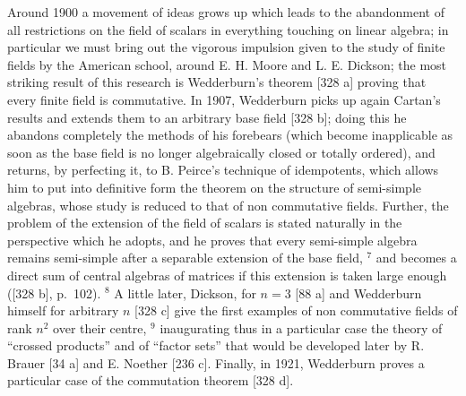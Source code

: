 Around 1900 a movement of ideas grows up which leads to the abandonment of all restrictions on the field of scalars in everything touching on linear algebra; in particular we must bring out the vigorous impulsion given to the study of finite fields by the American school, around E. H. Moore and L. E. Dickson; the most striking result of this research is Wedderburn's theorem {[}328 a{]} proving that every finite field is commutative. In 1907, Wedderburn picks up again Cartan's results and extends them to an arbitrary base field {[}328 b{]}; doing this he abandons completely the methods of his forebears (which become inapplicable as soon as the base field is no longer algebraically closed or totally ordered), and returns, by perfecting it, to B. Peirce's technique of idempotents, which allows him to put into definitive form the theorem on the structure of semi-simple algebras, whose study is reduced to that of non commutative fields. Further, the problem of the extension of the field of scalars is stated naturally in the perspective which he adopts, and he proves that every semi-simple algebra remains semi-simple after a separable extension of the base field, \(^{7}\) and becomes a direct sum of central algebras of matrices if this extension is taken large enough ({[}328 b{]}, p.~102). \(^{8}\) A little later, Dickson, for \(n = 3\) {[}88 a{]} and Wedderburn himself for arbitrary \(n\) {[}328 c{]} give the first examples of non commutative fields of rank \(n^{2}\) over their centre, \(^{9}\) inaugurating thus in a particular case the theory of ``crossed products'' and of ``factor sets'' that would be developed later by R. Brauer {[}34 a{]} and E. Noether {[}236 c{]}. Finally, in 1921, Wedderburn proves a particular case of the commutation theorem {[}328 d{]}.

